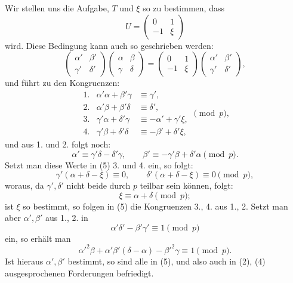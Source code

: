 \documentclass[11pt]{article}
\begin{document}
Wir stellen uns die Aufgabe, $T$ und $\xi$ so zu bestimmen, dass
\begin{equation}
 U=\begin{pmatrix}0&1\\-1&\xi\end{pmatrix}
\tag{4}
\end{equation}
wird. Diese Bedingung kann auch so geschrieben werden:
\[
 \begin{pmatrix}\alpha'&\beta'\\\gamma'&\delta'\end{pmatrix}
 \begin{pmatrix}\alpha&\beta\\\gamma&\delta\end{pmatrix}
 =
 \begin{pmatrix}0&1\\-1&\xi\end{pmatrix}
 \begin{pmatrix}\alpha'&\beta'\\\gamma'&\delta'\end{pmatrix},
\]
und führt zu den Kongruenzen:
\begin{equation}
\begin{array}{rcl}
1.&\alpha'\alpha+\beta'\gamma&\equiv\gamma',\\
2.&\alpha'\beta+\beta'\delta&\equiv\delta',\\
3.&\gamma'\alpha+\delta'\gamma&\equiv-\alpha'+\gamma'\xi,\\
4.&\gamma'\beta+\delta'\delta&\equiv-\beta'+\delta'\xi,
\end{array}\pmod p,
\tag{5}
\end{equation}
und aus 1. und 2. folgt noch:
\begin{equation}
 \alpha'\equiv\gamma'\delta-\delta'\gamma,
 \qquad
 \beta'\equiv-\gamma'\beta+\delta'\alpha\pmod p.
\tag{6}
\end{equation}
Setzt man diese Werte in (5) 3. und 4. ein, so folgt:
\[
 \gamma'(\alpha+\delta-\xi)\equiv0,
 \qquad
 \delta'(\alpha+\delta-\xi)\equiv0\pmod p,
\]
woraus, da $\gamma',\delta'$ nicht beide durch $p$ teilbar sein können, folgt:
\begin{equation}
 \xi\equiv\alpha+
\delta\pmod p;
\tag{7}
\end{equation}
ist $\xi$ so bestimmt, so folgen in (5) die Kongruenzen 3., 4. aus 1., 2. Setzt man aber $\alpha',\beta'$ aus 1., 2. in
\begin{equation}
 \alpha'\delta'-\beta'\gamma'\equiv1\pmod p
\tag{8}
\end{equation}
ein, so erhält man
\begin{equation}
 \alpha'^2\beta+\alpha'\beta'(\delta-\alpha)-\beta'^2\gamma\equiv1\pmod p.
\tag{9}
\end{equation}
Ist hieraus $\alpha',\beta'$ bestimmt, so sind alle in (5), und also auch in (2), (4) ausgesprochenen Forderungen befriedigt.
\end{document}
